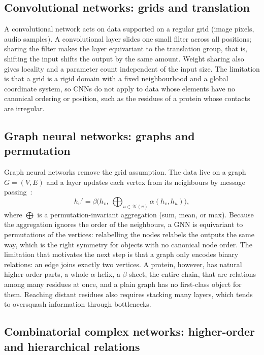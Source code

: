 \documentclass[11pt,a4paper]{article}
\theoremstyle{definition}
\begin{document}
\subsection{Convolutional networks: grids and translation}

A convolutional network acts on data supported on a regular grid (image pixels,
audio samples). A convolutional layer slides one small filter across all
positions; sharing the filter makes the layer equivariant to the translation
group, that is, shifting the input shifts the output by the same amount. Weight
sharing also gives locality and a parameter count independent of the input size.
The limitation is that a grid is a rigid domain with a fixed neighbourhood and a
global coordinate system, so CNNs do not apply to data whose elements have no
canonical ordering or position, such as the residues of a protein whose contacts
are irregular.

\subsection{Graph neural networks: graphs and permutation}

Graph neural networks remove the grid assumption. The data live on a graph
$G=(V,E)$ and a layer updates each vertex from its neighbours by message
passing~\cite{mpnn}:
\[
 h_v'=\beta\!\Big(h_v,\ \textstyle\bigoplus_{u\in\mathcal{N}(v)}\alpha(h_v,h_u)\Big),
\]
where $\bigoplus$ is a permutation-invariant aggregation (sum, mean, or max).
Because the aggregation ignores the order of the neighbours, a GNN is equivariant
to permutations of the vertices: relabelling the nodes relabels the outputs the
same way, which is the right symmetry for objects with no canonical node order.
The limitation that motivates the next step is that a graph only encodes binary
relations: an edge joins exactly two vertices. A protein, however, has natural
higher-order parts, a whole $\alpha$-helix, a $\beta$-sheet, the entire chain,
that are relations among many residues at once, and a plain graph has no
first-class object for them. Reaching distant residues also requires stacking
many layers, which tends to oversquash information through bottlenecks.

\subsection{Combinatorial complex networks: higher-order and hierarchical relations}
\end{document}
